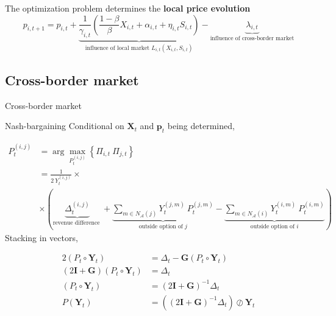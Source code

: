 \documentclass{beamer}
\newcommand{\matr}[1]{\bm{#1}}
\newcommand{\Y}{\matr{Y}}
\newcommand{\I}{\matr{I}}
\newcommand{\G}{\matr{G}}
\begin{document}
\begin{frame}

    The optimization problem determines the \textbf{local price evolution}
    \begin{equation*}
        p_{i, t+1} = p_{i, t} + \underbrace{\frac{1}{\gamma_{i, t}} \left( \frac{1-\beta}{\beta } X_{i, t} + \alpha_{i, t} + \eta_{i, t} S_{i, t} \right)}_{\text{influence of local market } L_{i, t}(X_{i, t}, S_{i, t})} - \underbrace{\lambda_{i, t}}_{\text{influence of cross-border market}}
    \end{equation*}

\end{frame}

\subsection{Cross-border market}

\begin{frame}{Cross-border market}
    \centering
    \resizebox{\textwidth}{!}{}
\end{frame}

\begin{frame}[allowframebreaks]{Nash-bargaining}
    Conditional on $\matr{X}_t$ and $\matr{p}_t$ being determined,

    \begin{equation*}
        \begin{split}
            P_t^{(i, j)} &= \arg \max_{P_t^{(i, j)}} \left\{\Pi_{i, t} \  \Pi_{j, t} \right\} \\
            &= \frac{1}{2\  Y_t^{(i, j)}} \times \\
            &\times \left( \underbrace{\Delta^{(i, j)}_t}_{\text{revenue difference }}
            + \underbrace{\sum_{m\in N_{\mathcal{A}}(j)} Y_t^{(j, m)} \  P_t^{(j, m)}}_{\text{outside option of } j}
            - \underbrace{\sum_{m \in N_{\mathcal{A}}(i)} Y_t^{(i, m)} \  P_t^{(i, m)}}_{\text{outside option of } i} \right)
        \end{split}
    \end{equation*}
    \newpage
    Stacking in vectors,

    \begin{equation*}
        \begin{split}
            2(P_t \circ \Y_t) &= \Delta_t  - \G \left( P_t \circ \Y_t \right) \\
            (2\I + \G) (P_t \circ \Y_t) &= \Delta_t  \\
            (P_t \circ \Y_t) &= (2\I + \G)^{-1} \Delta_t \\
            P(\Y_t) &= \left((2\I + \G)^{-1} \Delta_t \right) \oslash \Y_t
        \end{split}
    \end{equation*}
\end{frame}
\end{document}
